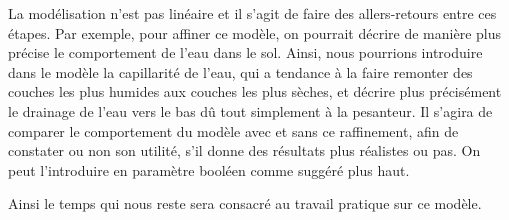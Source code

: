 La modélisation n'est pas linéaire et il s'agit de faire des allers-retours entre ces étapes. Par exemple, pour affiner ce modèle, on pourrait décrire de manière plus précise le comportement de l'eau dans le sol. Ainsi, nous pourrions introduire dans le modèle la capillarité de l'eau, qui a tendance à la faire remonter des couches les plus humides aux couches les plus sèches, et décrire plus précisément le drainage de l'eau vers le bas dû tout simplement à la pesanteur. Il s'agira de comparer le comportement du modèle avec et sans ce raffinement, afin de constater ou non son utilité, s'il donne des résultats plus réalistes ou pas. On peut l'introduire en paramètre booléen comme suggéré plus haut.

Ainsi le temps qui nous reste sera consacré au travail pratique sur ce modèle.
